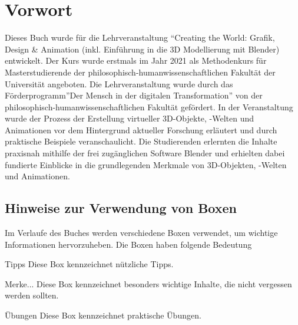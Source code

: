 \documentclass[
]{book}
\begin{document}
\clearpage
\tableofcontents
\clearpage

\chapter*{Vorwort}

\hfill\break


Dieses Buch wurde für die Lehrveranstaltung ``Creating the World:
Grafik, Design \& Animation (inkl. Einführung in die 3D Modellierung mit
Blender) entwickelt. Der Kurs wurde erstmals im Jahr 2021 als
Methodenkurs für Masterstudierende der
philosophisch-humanwissenschaftlichen Fakultät der Universität
angeboten. Die Lehrveranstaltung wurde durch das Förderprogramm''Der
Mensch in der digitalen Transformation'' von der
philosophisch-humanwissenschaftlichen Fakultät gefördert. In der
Veranstaltung wurde der Prozess der Erstellung virtueller 3D-Objekte,
-Welten und Animationen vor dem Hintergrund aktueller Forschung
erläutert und durch praktische Beispiele veranschaulicht. Die
Studierenden erlernten die Inhalte praxisnah mithilfe der frei
zugänglichen Software Blender und erhielten dabei fundierte Einblicke in
die grundlegenden Merkmale von 3D-Objekten, -Welten und Animationen.

\section*{Hinweise zur Verwendung von Boxen}

Im Verlaufe des Buches werden verschiedene Boxen verwendet, um wichtige
Informationen hervorzuheben. Die Boxen haben folgende Bedeutung

\begin{tipp}{Tipps}
Diese Box kennzeichnet nützliche Tipps.
\vspace{2\baselineskip}
\end{tipp}

\begin{remember}{Merke...}
Diese Box kennzeichnet besonders wichtige Inhalte, die nicht vergessen werden sollten.
\vspace{2\baselineskip}
\end{remember}

\begin{exercise}{Übungen}
Diese Box kennzeichnet praktische Übungen.
\vspace{2\baselineskip}
\vspace{2\baselineskip}
\end{exercise}
\end{document}
